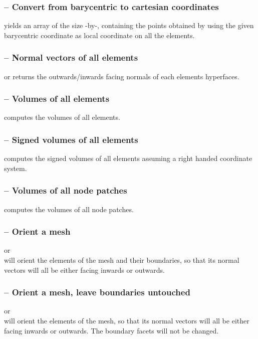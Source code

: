 \documentclass[twoside,11pt,a4paper]{article} %
\begin{document}
\subsubsection*{\texorpdfstring{ --}{} Convert from barycentric to cartesian coordinates}
 yields an array  of the size -by-, containing the points obtained by using the given barycentric coordinate as local coordinate on all the elements.
\subsubsection*{\texorpdfstring{ --}{} Normal vectors of all elements}
 or 
 returns the outwards/inwards facing normals of each elements hyperfaces.
\subsubsection*{\texorpdfstring{ --}{} Volumes of all elements}
 computes the volumes of all elements.
\subsubsection*{\texorpdfstring{ --}{} Signed volumes of all elements}
 computes the signed volumes of all elements assuming a right handed coordinate system.
\subsubsection*{\texorpdfstring{ --}{} Volumes of all node patches}
 computes the volumes of all node patches.
\subsubsection*{\texorpdfstring{ --}{} Orient a mesh}
 or \\
 will orient the elements of the mesh and their boundaries, so that its normal vectors will all be either facing inwards or outwards.
\subsubsection*{\texorpdfstring{ --}{} Orient a mesh, leave boundaries untouched}
 or \\
 will orient the elements of the mesh, so that its normal vectors will all be either facing inwards or outwards. The boundary facets will not be changed.
\end{document}
